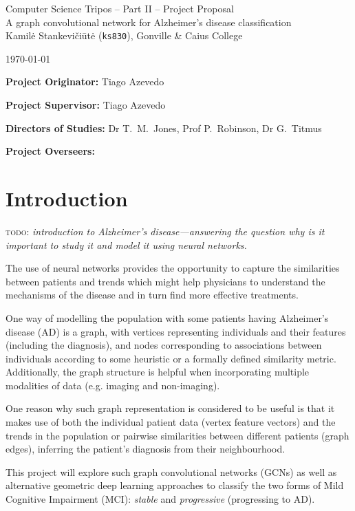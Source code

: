 \documentclass[12pt,a4paper,twoside]{article}
\begin{document}
\begin{center}
\Large
Computer Science Tripos -- Part II -- Project Proposal\\[4mm]
\LARGE
A graph convolutional network for Alzheimer's disease classification\\[4mm]

\large
Kamilė Stankevičiūtė (\texttt{ks830}), Gonville \& Caius College

\today %
\end{center}

\vspace{5mm}
\textbf{Project Originator:} Tiago Azevedo

\textbf{Project Supervisor:} Tiago Azevedo

\textbf{Directors of Studies:} Dr T.~M.~Jones, Prof P.~Robinson, Dr G.~Titmus

\textbf{Project Overseers:} 


\section*{Introduction}

\textsc{todo:} \textit{introduction to Alzheimer's disease—answering the question why is it important to study it and model it using neural networks.}

The use of neural networks provides the opportunity to capture the similarities between patients and trends which might help physicians to understand the mechanisms of the disease and in turn find more effective treatments. 

One way of modelling the population with some patients having Alzheimer's disease (AD) is a graph, with vertices representing individuals and their features (including the diagnosis), and nodes corresponding to associations between individuals according to some heuristic or a formally defined similarity metric. Additionally, the graph structure is helpful when incorporating multiple modalities of data (e.g. imaging and non-imaging).

One reason why such graph representation is considered to be useful is that it makes use of both the individual patient data (vertex feature vectors) and the trends in the population or pairwise similarities between different patients (graph edges), inferring the patient's diagnosis from their neighbourhood. 

This project will explore such graph convolutional networks (GCNs) as well as alternative geometric deep learning approaches to classify the two forms of Mild Cognitive Impairment (MCI): \textit{stable} and \textit{progressive} (progressing to AD).
\end{document}
